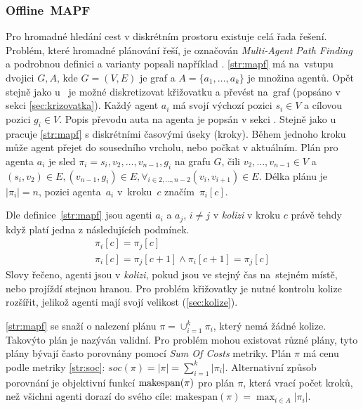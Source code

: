 \subsubsection{Offline~MAPF}\label{subsubsec:offline_mapf}

%

Pro hromadné hledání cest v diskrétním prostoru existuje celá řada řešení.
Problém, které hromadné plánování řeší, je označován \emph{Multi-Agent Path Finding} 
a podrobnou definici a varianty popsali například \citet{osti_10114869}.
\ref{str:mapf} má na~vstupu dvojici $G, A$, kde $G=(V, E)$ je graf a $A = \{a_1, \dots, a_k\}$ je množina agentů.
Opět stejně jako u~ je možné diskretizovat křižovatku
a převést na~graf (popsáno v sekci \ref{sec:krizovatka}).
Každý agent $a_i$ má svojí výchozí pozici $s_i \in V$ a cílovou pozici $g_i \in V$.
Popis převodu auta na agenta je popsán v sekci .
Stejně jako u  pracuje \ref{str:mapf} s diskrétními časovými úseky (kroky).
Během jednoho kroku může agent přejet do sousedního vrcholu, nebo počkat v aktuálním.
Plán pro agenta $a_i$ je sled $\pi_i = s_i, v_2, \dots, v_{n-1}, g_i$ na grafu $G$, čili $v_2, \dots, v_{n-1} \in V$ a
$(s_i, v_2) \in E, (v_{n-1}, g_i) \in E, \forall_{i \in 2, \dots, n-2} (v_i, v_{i+1}) \in E$.
Délka plánu je $|\pi_i| = n$, pozici agenta~$a_i$ v~kroku~$c$ značím~$\pi_i[c]$.

Dle definice~\ref{str:mapf} jsou agenti $a_i$ a $a_j$, $i \neq j$ v \emph{kolizi} v kroku $c$
právě tehdy když platí jedna z následujících podmínek.
\begin{gather}
	\pi_i[c] = \pi_j[c] \label{eq:mapf_kolize_vrchol}\\
	\pi_i[c] = \pi_j[c + 1] \land \pi_i[c + 1] = \pi_j[c] \label{eq:mapf_kolize_hrana}
\end{gather}
Slovy řečeno, agenti jsou v \emph{kolizi}, pokud jsou ve stejný čas na~stejném místě, nebo projíždí stejnou hranou.
Pro problém křižovatky je nutné kontrolu kolize rozšířit, jelikož agenti mají svojí velikost (\ref{sec:kolize}).

\ref{str:mapf} se snaží o nalezení plánu $\pi = \cup_{i=1}^{k} \pi_i$, který nemá žádné kolize.
Takovýto plán je nazýván validní.
Pro problém mohou existovat různé plány, tyto plány bývají často porovnány pomocí \emph{Sum Of Costs}  metriky.
Plán $\pi$ má cenu podle metriky \ref{str:soc}: $soc(\pi) = |\pi| = \sum_{i=1}^{k} |\pi_i|$.
Alternativní způsob porovnání je objektivní funkcí $\textrm{makespan}\labeltext{makespan}{str:makespan}(\pi)$ pro plán $\pi$,
která vrací počet kroků, než všichni agenti dorazí do svého cíle: $\textrm{makespan}(\pi)=\max_{i\in A} |\pi_i|$.

